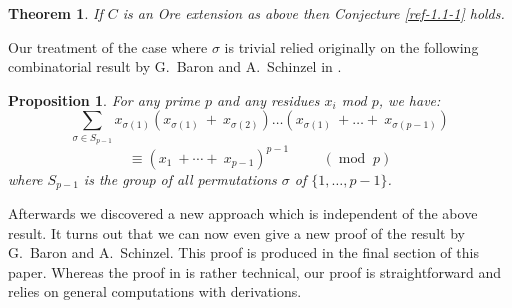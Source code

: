 \documentclass{amsart}
\numberwithin{equation}{section}
\let\blb\mathbb
\def \NN{{\blb N}}
\newtheorem{proposition}[lemma]{Proposition}
\newtheorem{theorem}[lemma]{Theorem}
\theoremstyle{definition}
\theoremstyle{remark}
\begin{document}
\begin{theorem} \label{ref-1.2-3}
If $C$ is an Ore extension as above then Conjecture
\ref{ref-1.1-1} holds.
\end{theorem}
\begin{comment}
\begin{enumerate} 
\item
$C$ has non-trivial center if and only if one of the following
conditions holds.
\begin{enumerate}
\item $\sigma$ and $\delta$ are non-trivial.
\item $\sigma$ is trivial, $\delta$ is not trivial  and $p>0$.
\item The order of $\sigma$ is finite and $\ge 2$.
\end{enumerate}


    Assume that $\sigma$ has finite order and that
    $\delta(x)\,=\,\lambda x^{n}\;+$ higher terms in $x$,where $n \geq 3$.
    \\ In that case $C$ will be finite over its center $Z(C)$ and
    $Z(C)\:=\:k[[z,w]]$, where $z\:=\:x^{p^{m}}\:+\:\varphi(x)$ and
    $w\:=\:y^{p^{m}}\:+\:\theta(x,y)$, for some $m \in \NN$ and
    $\varphi(x),\;\theta(x,y)$ have only terms of total degree
    $>p^{m}$.
\end{theorem}
\end{comment}





Our treatment of the case where $\sigma$ is trivial relied originally on the
following combinatorial result by  G.~Baron and A.~Schinzel in \cite{BS1}.
\begin{proposition} \label{ref-1.3-4}
    For any prime $p$ and any residues $x_{i}$ mod $p$, we have:
    \[\sum_{\sigma \in S_{p-1}}
    x_{\sigma(1)}(x_{\sigma(1)}\:+\:x_{\sigma(2)}) \ldots
    (x_{\sigma(1)}\:+ \ldots +\:x_{\sigma(p-1)}) \]
    \[ \equiv (x_{1}\:+ \cdots +\:x_{p-1})^{p-1} \hspace{1cm}
    (\operatorname{mod}\;p) \]
    where $S_{p-1}$ is the group of all permutations $\sigma$ of
    $\{1,\ldots,p-1\}$.
\end{proposition}
Afterwards we discovered a new approach which is independent of the above
result. It turns out that we can now even give a new proof of the
result by  G.~Baron and A.~Schinzel. This proof is produced in the
final section of this paper. Whereas the proof in \cite{BS1} is rather
technical, our proof is straightforward and relies on general
computations with derivations. 
\end{document}
